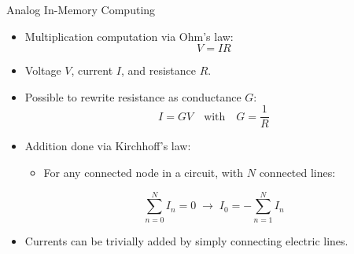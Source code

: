 \documentclass[xcolor=table,mathserif,9pt,usepdftitle=false]{beamer}    %
\begin{document}
\begin{frame}{Analog In-Memory Computing}
  \begin{itemize}
    \setlength{\itemsep}{6pt}
    \item Multiplication computation via Ohm's law:
          \begin{equation}
            V = IR
          \end{equation}
    \item Voltage $V$, current $I$, and resistance $R$.
    \item Possible to rewrite resistance as conductance $G$:
          \begin{equation}
            I = G V \quad \text{with} \quad G = \frac{1}{R}
          \end{equation}
    \item Addition done via Kirchhoff's law:
          \begin{itemize}
            \item For any connected node in a circuit, with $N$ connected lines:
          \end{itemize}
          \begin{equation}
            \sum_{n=0}^{N} I_n = 0 \;\rightarrow\; I_0 = - \sum_{n=1}^{N} I_n
          \end{equation}
    \item Currents can be trivially added by simply connecting electric lines.
  \end{itemize}
\end{frame}
\end{document}
